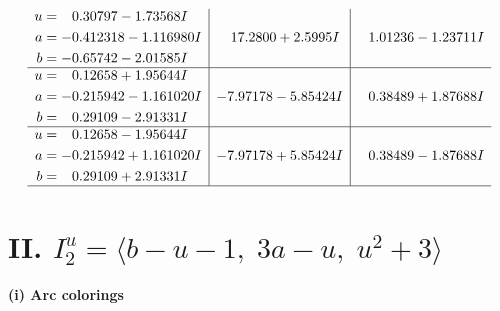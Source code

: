 \documentclass[1p]{elsarticle_modified}
\theoremstyle{definition}
\begin{document}
$$\begin{array}{c|c|c}
\begin{aligned}
u &= \phantom{-}0.30797 - 1.73568 I \\
a &= -0.412318 - 1.116980 I \\
b &= -0.65742 - 2.01585 I\end{aligned}
 & \phantom{-}17.2800 + 2.5995 I & \phantom{-}1.01236 - 1.23711 I \\ \hline\begin{aligned}
u &= \phantom{-}0.12658 + 1.95644 I \\
a &= -0.215942 - 1.161020 I \\
b &= \phantom{-}0.29109 - 2.91331 I\end{aligned}
 & -7.97178 - 5.85424 I & \phantom{-}0.38489 + 1.87688 I \\ \hline\begin{aligned}
u &= \phantom{-}0.12658 - 1.95644 I \\
a &= -0.215942 + 1.161020 I \\
b &= \phantom{-}0.29109 + 2.91331 I\end{aligned}
 & -7.97178 + 5.85424 I & \phantom{-}0.38489 - 1.87688 I\\
 \hline 
 \end{array}$$\newpage\newpage\renewcommand{\arraystretch}{1}
\centering \section*{II. $I^u_{2}= \langle b- u-1,\;3 a- u,\;u^2+3 \rangle$}
\flushleft \textbf{(i) Arc colorings}\\
\end{document}
